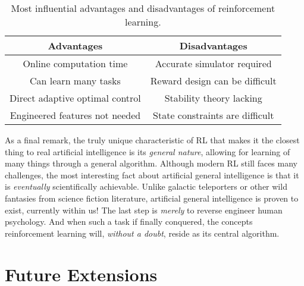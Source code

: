 \begin{table}[H]
\caption{Most influential advantages and disadvantages of reinforcement learning.}
\centering
\begin{tabular}{cc}
\toprule
\textbf{Advantages}	& \textbf{Disadvantages}\\
\midrule
Online computation time  & Accurate simulator required			 \\
Can learn many tasks	   & Reward design can be difficult		 \\
Direct adaptive optimal control       & Stability theory lacking    \\
Engineered features not needed & State constraints are difficult \\
\bottomrule
\end{tabular}
\label{tab:06adv_disadv}
\end{table}

As a final remark, the truly unique characteristic of RL that makes it the closest thing to real artificial intelligence is its \textit{general nature}, allowing for learning of many things through a general algorithm. Although modern RL still faces many challenges, the most interesting fact about artificial general intelligence is that it is \textit{eventually} scientifically achievable. Unlike galactic teleporters or other wild fantasies from science fiction literature, artificial general intelligence is proven to exist, currently within us!  The last step is \textit{merely} to reverse engineer human psychology. And when such a task if finally conquered, the concepts reinforcement learning will, \textit{without a doubt}, reside as its central algorithm.

\section{Future Extensions}

